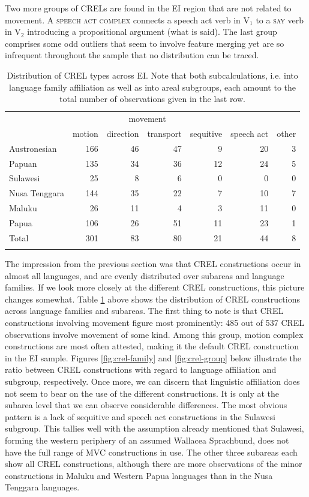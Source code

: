 Two more groups of CRELs are found in the EI region that are not related to movement. A \textsc{speech act complex} connects a speech act verb in V$_1$ to a \textsc{say} verb in V$_2$ introducing a propositional argument (what is said). The last group comprises some odd outliers that seem to involve feature merging yet are so infrequent throughout the sample that no distribution can be traced.

\begin{table}
\begin{tabular}{lrrrr|rr}
  \lsptoprule
& \multicolumn{4}{c}{movement} & & \\
 & {motion} & {direction} & {transport} & {sequitive} & {speech act} & {other}\\  
  \midrule
  Austronesian & 166 & 46 & 47 & 9 & 20 & 3 \tabularnewline
  Papuan & 135 & 34 &  36 &  12 & 24 & 5 \tabularnewline
   \midrule
  Sulawesi & 25 & 8 & 6 & 0 & 0 & 0 \tabularnewline
  Nusa Tenggara & 144 & 35 & 22 & 7 & 10 & 7 \tabularnewline
  Maluku & 26 & 11 & 4 & 3 & 11 & 0 \tabularnewline 
  Papua & 106 & 26 & 51 & 11 & 23 & 1 \tabularnewline 
\midrule
Total & 301 & 83 & 80 & 21 & 44 & 8 \tabularnewline
\lspbottomrule
\end{tabular}
\caption[Distribution of CREL types]{Distribution of CREL types across EI. Note that both subcalculations, i.e. into language family affiliation as well as into areal subgroups, each amount to the total number of observations given in the last row.}
\label{table:CREL_overview}
\end{table}

The impression from the previous section was that CREL constructions occur in almost all languages, and are evenly distributed over subareas and language families. If we look more closely at the different CREL constructions, this picture changes somewhat. Table \ref{table:CREL_overview} above shows the distribution of CREL constructions across language families and subareas. The first thing to note is that CREL constructions involving movement figure most prominently: 485 out of 537 CREL observations involve movement of some kind. Among this group, motion complex constructions are most often attested, making it the default CREL construction in the EI sample. Figures \ref{fig:crel-family} and \ref{fig:crel-group} below illustrate the ratio between CREL constructions with regard to language affiliation and subgroup, respectively. Once more, we can discern that linguistic affiliation does not seem to bear on the use of the different constructions. It is only at the subarea level that we can observe considerable differences. The most obvious pattern is a lack of sequitive and speech act constructions in the Sulawesi subgroup. This tallies well with the assumption already mentioned that Sulawesi, forming the western periphery of an assumed Wallacea Sprachbund, does not have the full range of MVC constructions in use. The other three subareas each show all CREL constructions, although there are more observations of the minor constructions in Maluku and Western Papua languages than in the Nusa Tenggara languages.

